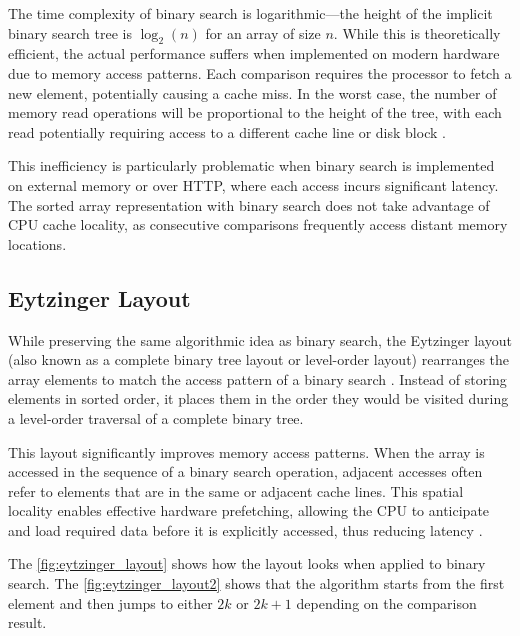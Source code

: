 The time complexity of binary search is logarithmic—the height of the implicit binary search tree is $\log_2(n)$ for an array of size $n$. While this is theoretically efficient, the actual performance suffers when implemented on modern hardware due to memory access patterns. Each comparison requires the processor to fetch a new element, potentially causing a cache miss. In the worst case, the number of memory read operations will be proportional to the height of the tree, with each read potentially requiring access to a different cache line or disk block \citep{binary_search}.

This inefficiency is particularly problematic when binary search is implemented on external memory or over HTTP, where each access incurs significant latency. The sorted array representation with binary search does not take advantage of CPU cache locality, as consecutive comparisons frequently access distant memory locations.

\subsection{Eytzinger Layout}
\label{tb:eytzinger_layout}

While preserving the same algorithmic idea as binary search, the Eytzinger layout (also known as a complete binary tree layout or level-order layout) rearranges the array elements to match the access pattern of a binary search \citep{binary_search}. Instead of storing elements in sorted order, it places them in the order they would be visited during a level-order traversal of a complete binary tree.

This layout significantly improves memory access patterns. When the array is accessed in the sequence of a binary search operation, adjacent accesses often refer to elements that are in the same or adjacent cache lines. This spatial locality enables effective hardware prefetching, allowing the CPU to anticipate and load required data before it is explicitly accessed, thus reducing latency \citep{binary_search}.

The \autoref{fig:eytzinger_layout} shows how the layout looks when applied to binary search. The \autoref{fig:eytzinger_layout2} shows that the algorithm starts from the first element and then jumps to either $2k$ or $2k+1$ depending on the comparison result.

